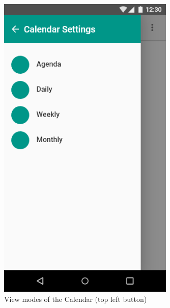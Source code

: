 \documentclass[a4paper,11pt]{article} %
\begin{document}
\begin{figure}[h!]
  \centering
  \includegraphics[width=0.75\textwidth]{img/ui-wireframe/Calendar-View.png}
  \caption{View modes of the Calendar (top left button)}
\end{figure}
\end{document}
